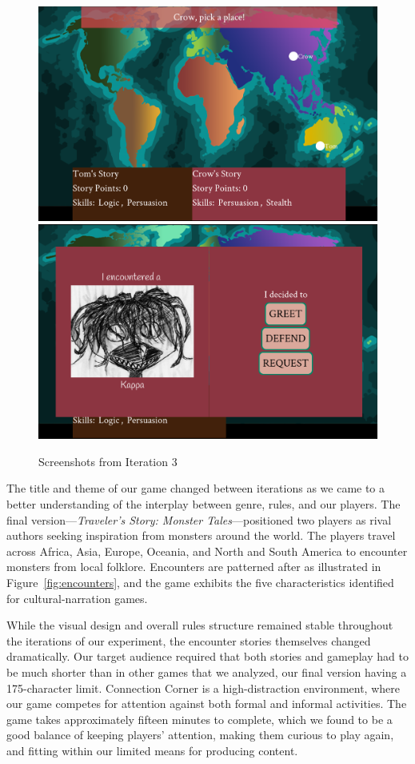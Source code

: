 \documentclass[a4paper]{article}
\begin{document}
\begin{figure}
\centering
\includegraphics[width=\figwidth]{i3-shot1}
\includegraphics[width=\figwidth]{i3-shot2}
\caption{Screenshots from Iteration 3}
\label{fig:paper-prototype}
\end{figure}

The title and theme of our game changed between iterations as we came
to a better understanding of the interplay between genre, rules, and our
players.  The final version---\textit{Traveler's Story: Monster
  Tales}---positioned two players as rival authors seeking inspiration
from monsters around the world. The players travel across Africa,
Asia, Europe, Oceania, and North and South America to encounter
monsters from local folklore.  Encounters are patterned after \totan{}
as illustrated in Figure~\ref{fig:encounters}, and the game exhibits
the five characteristics identified for cultural-narration games.

While the visual design and overall rules structure remained stable
throughout the iterations of our experiment, the encounter stories
themselves changed dramatically.
Our target audience required that both stories and gameplay 
had to be much shorter than in other games that we analyzed,
our final version having a 175-character limit.
Connection Corner is a high-distraction environment,
where our game competes for attention against both formal and informal
activities. The game takes approximately fifteen minutes to complete,
which we found to be a good balance of keeping players' attention,
making them curious to play again,
and fitting within our limited means for producing content.
\end{document}
